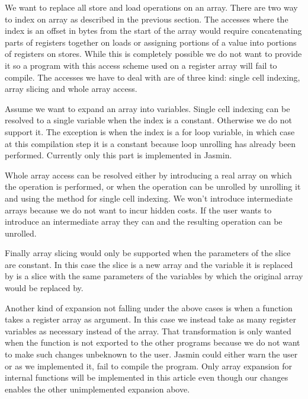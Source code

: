\documentclass{article}
\begin{document}
\medskip

We want to replace all store and load operations on an array. There are two way
to index on array as described in the previous section. The accesses where the
index is an offset in bytes from the start of the array would require
concatenating parts of registers together on loads or assigning portions of a
value into portions of registers on stores. While this is completely possible we
do not want to provide it so a program with this access scheme used on a
register array will fail to compile.
The accesses we have to deal with are of three kind: single cell indexing,
array slicing and whole array access.

\smallskip

Assume we want to expand an array into variables. Single cell indexing can be
resolved to a single variable when the index is a constant. Otherwise we do not
support it. The exception is when the index is a for loop variable, in which
case at this compilation step it is a constant because loop unrolling has
already been performed.
Currently only this part is implemented in Jasmin.

Whole array access can be resolved either by introducing a real array on which
the operation is performed, or when the operation can be unrolled by unrolling
it and using the method for single cell indexing. We won't introduce
intermediate arrays because we do not want to incur hidden costs. If the user
wants to introduce an intermediate array they can and the resulting operation
can be unrolled. 

Finally array slicing would only be supported when the parameters of the slice
are constant. In this case the slice is a new array and the variable it is
replaced by is a slice with the same parameters of the variables by which the
original array would be replaced by.

\smallskip

Another kind of expansion not falling under the above cases is when a function
takes a register array as argument. In this case we instead take as many
register variables as necessary instead of the array.
That transformation is only wanted when the function is not exported to the
other programs because we do not want to make such changes unbeknown to the
user. Jasmin could either warn the user or as we implemented it, fail to
compile the program.
Only array expansion for internal functions will be implemented in this article
even though our changes enables the other unimplemented expansion above.
\end{document}

